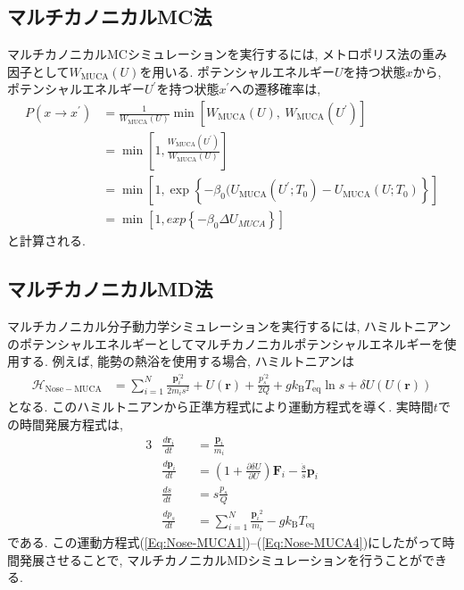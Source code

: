 \subsection{マルチカノニカルMC法}
マルチカノニカルMCシミュレーションを実行するには, メトロポリス法の重み因子として$W_{\mathrm{MUCA}}(U)$を用いる. 
ポテンシャルエネルギー$U$を持つ状態$x$から, ポテンシャルエネルギー$U^{\prime}$を持つ状態$x^{\prime}$への遷移確率は, 
\begin{align}
  P(x \to x^{\prime}) &=
  \frac{1}{W_{\mathrm{MUCA}}(U)} \min \left[W_{\mathrm{MUCA}}(U),~W_{\mathrm{MUCA}}(U^{\prime}) \right] \\ &=
  \min \left[1, \frac{W_{\mathrm{MUCA}}(U^{\prime})}{W_{\mathrm{MUCA}}(U)} \right] \\ &=
  \min \left[1, \exp\left\{-\beta_{0}( U_{\mathrm{MUCA}}(U^{\prime};T_{0}) - U_{\mathrm{MUCA}}(U;T_{0})\right\} \right] \\ &=
  \min \left[1, exp\left\{-\beta_{0} \Delta U_{MUCA} \right\}\right]
\end{align}
と計算される. 

\subsection{マルチカノニカルMD法}
マルチカノニカル分子動力学シミュレーションを実行するには, ハミルトニアンのポテンシャルエネルギーとしてマルチカノニカルポテンシャルエネルギーを使用する. 
例えば, 能勢の熱浴を使用する場合, ハミルトニアンは
\begin{align}
  \mathcal{H}_{\mathrm{Nose-MUCA}} &=
  \sum_{i=1}^{N} \frac{\bm{p}_{i}^{\prime 2}}{2 m_{i} s^{2}} +
  U(\bm{r}) +
  \frac{p_{s}^{\prime 2}}{2Q} +
  g k_{\mathrm{B}}T_{\mathrm{eq}} \ln s +
  \delta U(U(\bm{r}))
  \label{Eq:Hamiltonian-Nose-MUCA}
\end{align}
となる. このハミルトニアンから正準方程式により運動方程式を導く. 実時間$t$での時間発展方程式は, 
\begin{alignat}{3}
  &
  \frac{d \bm{r}_{i}}{d t} &&=
  \frac{\bm{p}_{i}}{m_{i} }
  \label{Eq:Nose-MUCA1}
  \\
  &
  \frac{d \bm{p}_{i}}{d t} &&=
  \left(1 + \frac{\partial \delta U}{\partial U}\right)\bm{F}_{i} - \frac{\dot{s}}{s} \bm{p}_{i}
  \label{Eq:Nose-MUCA2}
  \\
  &
  \frac{d s}{d t} &&=
  s \frac{p_{s}}{Q}
  \label{Eq:Nose-MUCA3}
  \\
  &
  \frac{d p_{s}}{d t} &&=
  \sum_{i=1}^{N} \frac{{\bm{p}_{i}}^{2}}{m_{i}} -g k_{\mathrm{B}} T_{\mathrm{eq}}
  \label{Eq:Nose-MUCA4}
\end{alignat}
である. この運動方程式(\ref{Eq:Nose-MUCA1})--(\ref{Eq:Nose-MUCA4})にしたがって時間発展させることで, 
マルチカノニカルMDシミュレーションを行うことができる. 

